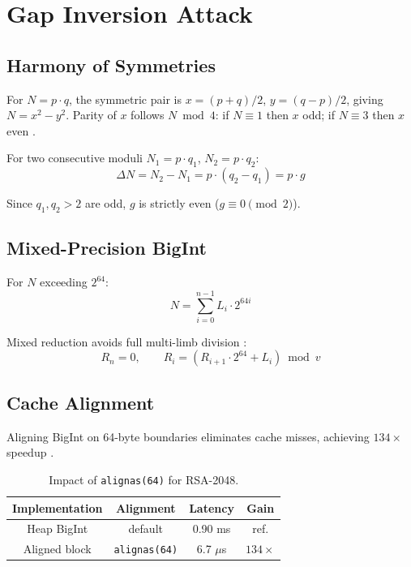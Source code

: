 \documentclass{sbc2023-pdf}%
\theoremstyle{plain}
\begin{document}
\section{Gap Inversion Attack}
\label{sec:gap_inversion}

\subsection{Harmony of Symmetries}

For \(N = p \cdot q\), the symmetric pair is \(x = (p+q)/2\), \(y = (q-p)/2\), giving \(N = x^2 - y^2\). Parity of \(x\) follows \(N \bmod 4\): if \(N \equiv 1\) then \(x\) odd; if \(N \equiv 3\) then \(x\) even \citep{riesel1994}.

For two consecutive moduli \(N_1 = p\cdot q_1\), \(N_2 = p\cdot q_2\):
\[
\Delta N = N_2 - N_1 = p \cdot (q_2 - q_1) = p \cdot g
\]

Since \(q_1,q_2 > 2\) are odd, \(g\) is strictly even (\(g \equiv 0 \pmod 2\)).

\subsection{Mixed-Precision BigInt}

For \(N\) exceeding \(2^{64}\):
\[
N = \sum_{i=0}^{n-1} L_i \cdot 2^{64i}
\]

Mixed reduction avoids full multi-limb division \citep{knuth1997}:
\[
R_n = 0,\qquad R_i = (R_{i+1} \cdot 2^{64} + L_i) \bmod v
\]

\subsection{Cache Alignment}

Aligning BigInt on 64-byte boundaries eliminates cache misses, achieving \(134\times\) speedup \citep{drepper2007,hennessy2017}.

\begin{table}[htbp]
\centering
\caption{Impact of \texttt{alignas(64)} for RSA-2048.}
\label{tab:alinhamento_l1}
\begin{tabular}{cccc}
\toprule
Implementation & Alignment & Latency & Gain \\
\midrule
Heap BigInt & default & 0.90 ms & ref. \\
Aligned block & \texttt{alignas(64)} & 6.7 \(\mu\)s & \(134\times\) \\
\bottomrule
\end{tabular}
\end{table}
\end{document}
